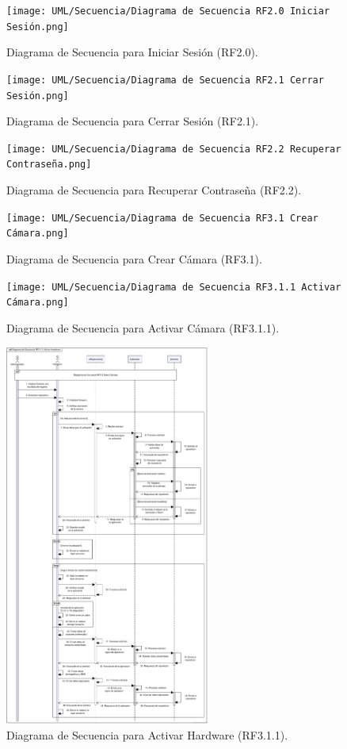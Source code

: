 \begin{figure}[H]
	\centering
	\caption{Diagrama de Secuencia para Iniciar Sesión (RF2.0).}
	\texttt{[image: UML/Secuencia/Diagrama de Secuencia RF2.0 Iniciar Sesión.png]}
\end{figure}


\begin{figure}[H]
	\centering
	\caption{Diagrama de Secuencia para Cerrar Sesión (RF2.1).}
 \texttt{[image: UML/Secuencia/Diagrama de Secuencia RF2.1 Cerrar Sesión.png]}
\end{figure}


\begin{figure}[H]
	\centering
		\caption{Diagrama de Secuencia para Recuperar Contraseña (RF2.2).}
	\texttt{[image: UML/Secuencia/Diagrama de Secuencia RF2.2 Recuperar Contraseña.png]}
\end{figure}


\begin{figure}[H]
	\centering
		\caption{Diagrama de Secuencia para Crear Cámara (RF3.1).}
	\texttt{[image: UML/Secuencia/Diagrama de Secuencia RF3.1 Crear Cámara.png]}
\end{figure}


\begin{figure}[H]
	\centering
		\caption{Diagrama de Secuencia para Activar Cámara (RF3.1.1).}
	\texttt{[image: UML/Secuencia/Diagrama de Secuencia RF3.1.1 Activar Cámara.png]}
\end{figure}


\begin{figure}[H]
	\centering
	\caption{Diagrama de Secuencia para Activar Hardware (RF3.1.1).}
	\includegraphics[width=0.6\textwidth]{UML/Secuencia/Diagrama de Secuencia RF3.1.1 Activar Hardware.png}
\end{figure}


